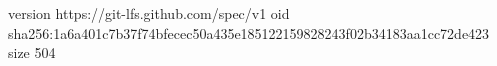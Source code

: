version https://git-lfs.github.com/spec/v1
oid sha256:1a6a401c7b37f74bfecec50a435e185122159828243f02b34183aa1cc72de423
size 504
